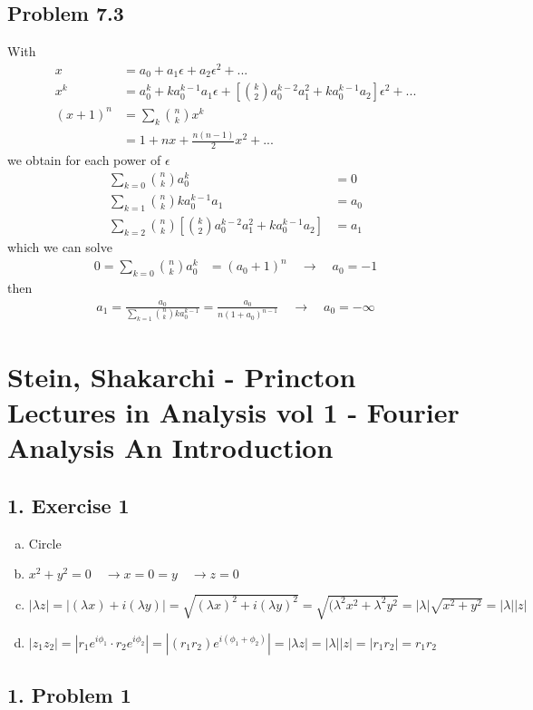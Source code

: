 \documentclass[../main.tex]{subfiles}
\begin{document}
\subsection{Problem 7.3}
With
\begin{align}
x&=a_0+a_1\epsilon+a_2\epsilon^2+...\\
x^k&=a_0^k+ka_0^{k-1}a_1\epsilon+\left[\binom{k}{2}a_0^{k-2}a_1^2+ka_0^{k-1}a_2\right]\epsilon^2+...\\
(x+1)^n
&=\sum_k\binom{n}{k}x^k\\
&=1+nx+\frac{n(n-1)}{2}x^2+...
\end{align}
we obtain for each power of $\epsilon$
\begin{align}
\sum_{k=0}\binom{n}{k}a_0^k&=0\\
\sum_{k=1}\binom{n}{k}ka_0^{k-1}a_1&=a_0\\
\sum_{k=2}\binom{n}{k}\left[\binom{k}{2}a_0^{k-2}a_1^2+ka_0^{k-1}a_2\right]&=a_1
\end{align}
which we can solve
\begin{align*}
0=\sum_{k=0}\binom{n}{k}a_0^k&=(a_0+1)^n\quad\rightarrow\quad a_0=-1
\end{align*}
then
\begin{align}
a_1=\frac{a_0}{\sum_{k=1}\binom{n}{k}ka_0^{k-1}}=\frac{a_0}{n(1+a_0)^{n-1}}\quad\rightarrow\quad a_0=-\infty
\end{align}

\section{{\sc Stein, Shakarchi} - Princton Lectures in Analysis vol 1 - Fourier Analysis An Introduction}
\subsection{1. Exercise 1}
\begin{enumerate}[(a)]
\item Circle
\item $x^2+y^2=0\quad\rightarrow x=0=y\quad\rightarrow z=0$
\item 
$|\lambda z|
=|(\lambda x)+i(\lambda y)|
=\sqrt{(\lambda x)^2+i(\lambda y)^2}
=\sqrt{(\lambda^2 x^2+\lambda^2 y^2}
=|\lambda|\sqrt{x^2+y^2}=|\lambda||z|$
\item 
$|z_1z_2|
=|r_1e^{i\phi_1}\cdot r_2e^{i\phi_2}|
=|(r_1r_2)e^{i(\phi_1+\phi_2)}|=|\lambda z|=|\lambda||z|=|r_1r_2|=r_1r_2
$
\end{enumerate}

\subsection{1. Problem 1}
\end{document}
